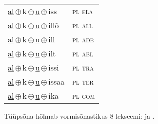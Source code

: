 \begin{minipage}{\textwidth}
\begin{sideways}
\begin{tabular}{l l}
\underline{al}\,$\oplus$\,k\,$\oplus$\,\underline{u}\,$\oplus$\,iss & \textsc{ pl ela } \\
\underline{al}\,$\oplus$\,k\,$\oplus$\,\underline{u}\,$\oplus$\,illõ & \textsc{ pl all } \\
\underline{al}\,$\oplus$\,k\,$\oplus$\,\underline{u}\,$\oplus$\,ill & \textsc{ pl ade } \\
\underline{al}\,$\oplus$\,k\,$\oplus$\,\underline{u}\,$\oplus$\,ilt & \textsc{ pl abl } \\
\underline{al}\,$\oplus$\,k\,$\oplus$\,\underline{u}\,$\oplus$\,issi & \textsc{ pl tra } \\
\underline{al}\,$\oplus$\,k\,$\oplus$\,\underline{u}\,$\oplus$\,issaa & \textsc{ pl ter } \\
\underline{al}\,$\oplus$\,k\,$\oplus$\,\underline{u}\,$\oplus$\,ika & \textsc{ pl com } \\
\end{tabular}
\end{sideways}
\label{tab:tüüpsõnamall-alku}

\end{minipage}

 
\vspace{1em}
\noindent Tüüpsõna hõlmab vormisõnastikus 8 lekseemi:  ja .
